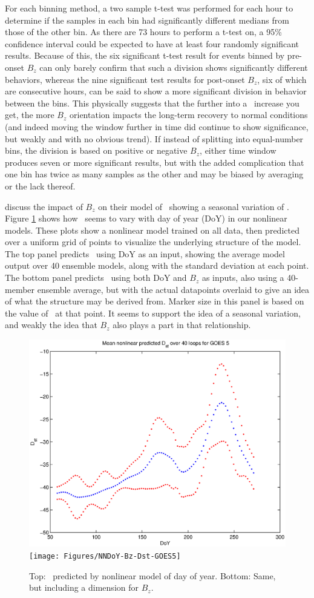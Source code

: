 For each binning method, a two sample t-test was performed for each hour to determine if the samples in each bin had significantly different medians from those of the other bin. As there are 73 hours to perform a t-test on, a 95\% confidence interval could be expected to have at least four randomly significant results. Because of this, the six significant t-test result for events binned by pre-onset $B_z$ can only barely confirm that such a division shows significantly different behaviors, whereas the nine significant test results for post-onset $B_z$, six of which are consecutive hours, can be said to show a more significant division in behavior between the bins. This physically suggests that the further into a \req\ increase you get, the more $B_z$ orientation impacts the long-term recovery to normal conditions (and indeed moving the window further in time did continue to show significance, but weakly and with no obvious trend). If instead of splitting into equal-number bins, the division is based on positive or negative $B_z$, either time window produces seven or more significant results, but with the added complication that one bin has twice as many samples as the other and may be biased by averaging or the lack thereof. 

\cite{Temerin2002NewModelPredictionDst} discuss the impact of $B_z$ on their model of \dst\ showing a seasonal variation of \dst. Figure \ref{fig:DoYDst} shows how \dst\ seems to vary with day of year (DoY) in our nonlinear models. These plots show a nonlinear model trained on all data, then predicted over a uniform grid of points to visualize the underlying structure of the model. The top panel predicts \dst\ using DoY as an input, showing the average model output over 40 ensemble models, along with the standard deviation at each point. The bottom panel predicts \dst\ using both DoY and $B_z$ as inputs, also using a 40-member ensemble average, but with the actual datapoints overlaid to give an idea of what the structure may be derived from. Marker size in this panel is based on the value of \dst\ at that point. It seems to support the idea of a seasonal variation, and weakly the idea that $B_z$ also plays a part in that relationship.


\begin{figure}[htp!]
	\centering
	\includegraphics[width=0.7\linewidth]{Figures/NNDoY-Dst-GOES5}	
	\texttt{[image: Figures/NNDoY-Bz-Dst-GOES5]}
	\caption{Top: \dst\ predicted by nonlinear model of day of year. Bottom: Same, but including a dimension for $B_z$.}
	\label{fig:DoYDst}
\end{figure}
